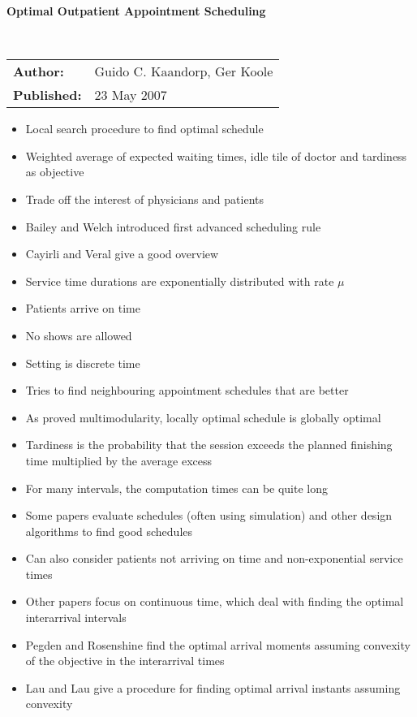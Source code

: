 \documentclass{article}
\begin{document}
\textbf{Optimal Outpatient Appointment Scheduling}

\ \newline

\begin{tabular}{l l}
    \textbf{Author:} & Guido C. Kaandorp, Ger Koole \\
    \textbf{Published:} & 23 May 2007 \\
\end{tabular}

\begin{itemize}
	\item Local search procedure to find optimal schedule
    \item Weighted average of expected waiting times, idle tile of doctor and tardiness as objective
    \item Trade off the interest of physicians and patients
    \item Bailey and Welch introduced first advanced scheduling rule
    \item Cayirli and Veral give a good overview
    \item Service time durations are exponentially distributed with rate $\mu$
    \item Patients arrive on time
    \item No shows are allowed
    \item Setting is discrete time
    \item Tries to find neighbouring appointment schedules that are better
    \item As proved multimodularity, locally optimal schedule is globally optimal
    \item Tardiness is the probability that the session exceeds the planned finishing time multiplied by the average excess
    \item For many intervals, the computation times can be quite long
    \item Some papers evaluate schedules (often using simulation) and other design algorithms to find good schedules
    \item Can also consider patients not arriving on time and non-exponential service times
    \item Other papers focus on continuous time, which deal with finding the optimal interarrival intervals
    \item Pegden and Rosenshine find the optimal arrival moments assuming convexity of the objective in the interarrival times
    \item Lau and Lau give a procedure for finding optimal arrival instants assuming convexity

\end{itemize}
\end{document}
